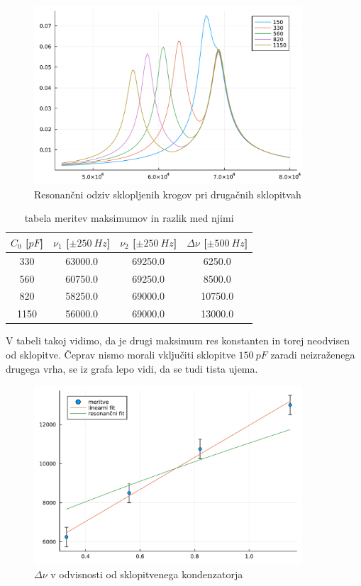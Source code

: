 \documentclass[12pt]{article}
\begin{document}
\begin{figure}[ht]
\begin{center}
    \includegraphics[width=10cm]{multi.pdf}
    \caption{Resonančni odziv sklopljenih krogov pri drugačnih sklopitvah}
\end{center}
\end{figure}

\begin{table}[!ht]
\centering
\begin{tabular}{c|c|c|c}
$C_0$ [$pF$] & $\nu_1$ [$\pm 250\ Hz$] & $\nu_2$ [$\pm 250\ Hz$] & $\Delta \nu$ [$\pm 500\ Hz$] \\\hline
  330 & 63000.0 & 69250.0 & 6250.0 \\
  560 & 60750.0 & 69250.0 & 8500.0 \\
  820 & 58250.0 & 69000.0 & 10750.0 \\
  1150 & 56000.0 & 69000.0 & 13000.0 \\
\end{tabular}
\caption{tabela meritev maksimumov in razlik med njimi}
\end{table}
\newpage
\noindent V tabeli takoj vidimo, da je drugi maksimum res konstanten in torej neodvisen od sklopitve. Čeprav nismo morali vključiti sklopitve $150\ pF$ zaradi neizraženega drugega vrha, se iz grafa lepo vidi, da se tudi tista ujema. 

\begin{figure}[ht]
\begin{center}
    \includegraphics[width=10cm]{fitbit.pdf}
    \caption{$\Delta \nu$ v odvisnosti od sklopitvenega kondenzatorja}
\end{center}
\end{figure}
\end{document}
